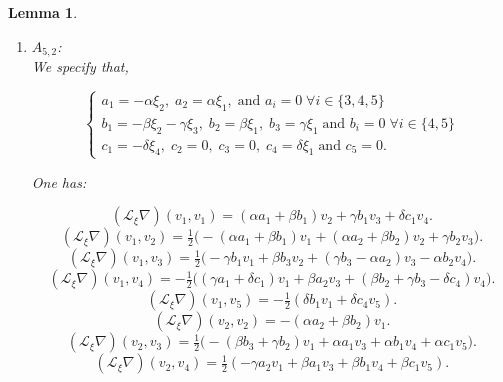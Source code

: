 \documentclass[10pt]{article}
\newtheorem{Lemma}{Lemma}
\begin{document}
\begin{Lemma}
\begin{enumerate}
  \item \(A_{5,2}\):\\
  
 We specify that,
 
\[\begin{cases} 
a_1=-\alpha\xi_2,\; a_2=\alpha\xi_1,\; 
\text{and $a_i=0$}\; \forall i\in \{3,4,5\}\\ 
b_1=- \beta\xi_2-\gamma\xi_3 ,\; 
b_2= \beta\xi_1, \; b_3=\gamma\xi_1\; \text{and $b_i=0$} \;\forall i\in \{4,5\}\\ 
c_1=-\delta\xi_4,\; 
c_2= 0, \; c_3=0,\; c_4=\delta\xi_1\; \text{and $c_5=0$}.
\end{cases}\]

One has:

\begin{equation}
    (\mathscr{L}_\xi\nabla) (v_1,v_1)=(\alpha a_1+\beta b_1)v_2+\gamma b_1v_3+\delta c_1 v_4.\label{66}
\end{equation} 
\begin{equation}
  (\mathscr{L}_\xi\nabla) (v_1,v_2)=\tfrac{1}{2}\Big(-(\alpha a_1+\beta b_1)v_1+(\alpha a_2+\beta b_2)v_2+\gamma b_2v_3\Big).  \label{67}
\end{equation}
\begin{equation}
   (\mathscr{L}_\xi\nabla) (v_1,v_3)=\tfrac{1}{2}\Big(-\gamma b_1 v_1+\beta b_3v_2+(\gamma b_3-\alpha a_2)v_3-\alpha b_2v_4\Big).\label{68} 
\end{equation}
\begin{equation}
   (\mathscr{L}_\xi\nabla) (v_1,v_4)=-\tfrac{1}{2}\Big((\gamma a_1+\delta c_1)v_1+\beta a_2v_3+(\beta b_2 +\gamma b_3-\delta c_4)v_4\Big).\label{69} 
\end{equation}
\begin{equation}
 (\mathscr{L}_\xi\nabla) (v_1,v_5)=-\tfrac{1}{2}(\delta b_1v_1+\delta c_4v_5). \label{70}  
\end{equation}
\begin{equation}
 (\mathscr{L}_\xi\nabla) (v_2,v_2)=-(\alpha a_2+\beta b_2)v_1.   \label{71}
\end{equation}
\begin{equation}
 (\mathscr{L}_\xi\nabla) (v_2,v_3)=\tfrac{1}{2}\bigr(-(\beta b_3+\gamma b_2)v_1+\alpha a_1 v_3 + \alpha b_1 v_4+ \alpha c_1 v_5\bigr).  \label{72} 
\end{equation}
\begin{equation}
 (\mathscr{L}_\xi\nabla) (v_2,v_4)=\tfrac{1}{2}(-\gamma a_2v_1+\beta a_1v_3+\beta b_1 v_4+\beta c_1v_5). \label{73}   
\end{equation}

\end{enumerate}
\end{Lemma}
\end{document}
